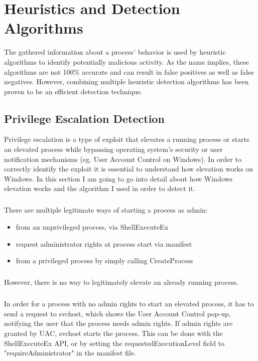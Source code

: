 \chapter{Heuristics and Detection Algorithms}
    The gathered information about a process' behavior is used by heuristic algorithms to identify potentially malicious activity. As the name
    implies, these algorithms are not 100\% accurate and can result in false positives as well as false negatives. However, combining multiple
    heuristic detection algorithms has been proven to be an efficient detection technique.

    \section{Privilege Escalation Detection}
        Privilege escalation is a type of exploit that elevates a running process or starts an elevated process while bypassing operating system's
        security or user notification mechanisms (eg. User Account Control on Windows). In order to correctly identify the exploit it is essential
        to understand how elevation works on Windows. In this section I am going to go into detail about how Windows elevation works and the
        algorithm I used in order to detect it.

        \paragraph{}
        There are multiple legitimate ways of starting a process as admin:
        \begin{itemize}
            \item from an unprivileged process, via ShellExecuteEx %
            \item request administrator rights at process start via manifest
            \item from a privileged process by simply calling CreateProcess
        \end{itemize}

        \paragraph{}
        However, there is no way to legitimately elevate an already running process.

        \paragraph{}
        In order for a process with no admin rights to start an elevated process, it has to send a request to svchost, which shows the User Account
        Control pop-up, notifying the user that the process needs admin rights. If admin rights are granted by UAC, svchost starts the process.
        This can be done with the ShellExecuteEx API, or by setting the requestedExecutionLevel field to "requireAdministrator" in the manifest
        file.

